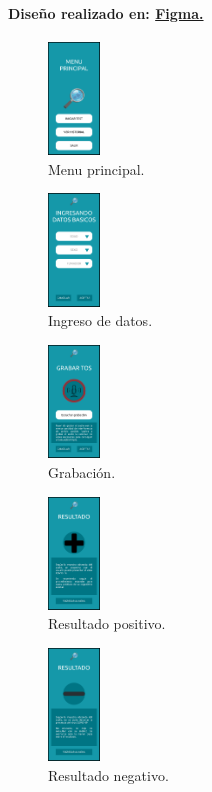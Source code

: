 \documentclass[a4paper,11pt,twocolumn]{article}
\begin{document}
\paragraph{Diseño realizado en: \href{https://www.figma.com/proto/M8RWGFdiOidZSZONJyYMPn/TFG?node-id=2\%3A3&starting-point-node-id=2\%3A3}{Figma.}}
\begin{figure}[H]
\centering
\includegraphics[height=3cm]{figma01}
\caption{Menu principal.}
\end{figure}
\begin{figure}[H]
\centering
\includegraphics[height=3cm]{figma02}
\caption{Ingreso de datos.}
\end{figure}
\begin{figure}[H]
\centering
\includegraphics[height=3cm]{figma03}
\caption{Grabación.}
\end{figure}
\begin{figure}[H]
\centering
\includegraphics[height=3cm]{figma04}
\caption{Resultado positivo.}
\end{figure}
\begin{figure}[H]
\centering
\includegraphics[height=3cm]{figma05}
\caption{Resultado negativo.}
\end{figure}
\end{document}
